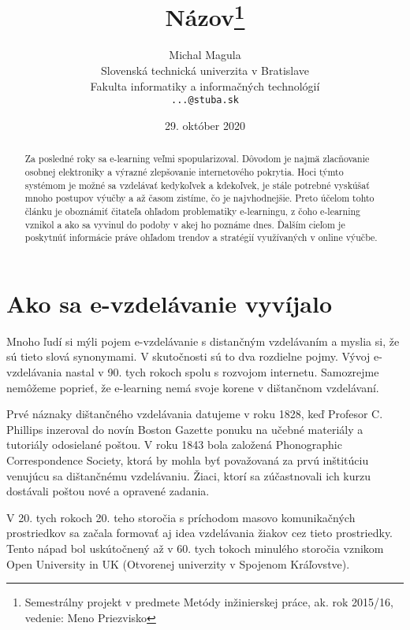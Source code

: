 \documentclass[10pt,twoside,slovak,a4paper]{article}
\title{Názov\thanks{Semestrálny projekt v predmete Metódy inžinierskej práce, ak. rok 2015/16, vedenie: Meno Priezvisko}} %
\author{Michal Magula\\[2pt]
	{\small Slovenská technická univerzita v Bratislave}\\
	{\small Fakulta informatiky a informačných technológií}\\
	{\small \texttt{...@stuba.sk}}
	}
\date{\small 29. október 2020}
\begin{document}
    \begin{abstract}
        Za posledné roky sa e-learning veľmi spopularizoval. Dôvodom je najmä zlacňovanie osobnej elektroniky
        a výrazné zlepšovanie internetového pokrytia. Hoci týmto systémom je možné sa vzdelávať kedykoľvek
        a kdekoľvek, je stále potrebné vyskúšať mnoho postupov výučby a až časom zistíme, čo je najvhodnejšie.
        Preto účelom tohto článku je oboznámiť čitateľa ohľadom problematiky e-learningu, z čoho e-learning
        vznikol a ako sa vyvinul do podoby v akej ho poznáme dnes. Ďalším cieľom je poskytnúť informácie práve
        ohľadom trendov a stratégií využívaných v online výučbe.
    \end{abstract}

    \section{Ako sa e-vzdelávanie vyvíjalo}
        Mnoho ľudí si mýli pojem e-vzdelávanie s distančným vzdelávaním a myslia si, že sú tieto slová synonymami.
        V skutočnosti sú to dva rozdielne pojmy. Vývoj e-vzdelávania nastal v 90. tych rokoch spolu s rozvojom internetu.
        Samozrejme nemôžeme poprieť, že e-learning nemá svoje korene v dištančnom vzdelávaní.

        Prvé náznaky dištančného vzdelávania datujeme v roku 1828, keď Profesor C. Phillips inzeroval do novín
        Boston Gazette ponuku na učebné materiály a tutoriály odosielané poštou. V roku 1843 bola 
        založená Phonographic Correspondence Society, ktorá by mohla byť považovaná za prvú inštitúciu 
        venujúcu sa dištančnému vzdelávaniu. Žiaci, ktorí sa zúčastnovali ich kurzu dostávali poštou
        nové a opravené zadania.

        V 20. tych rokoch 20. teho storočia s príchodom masovo komunikačných prostriedkov sa začala formovať aj idea
        vzdelávania žiakov cez tieto prostriedky. Tento nápad bol uskútočnený až v 60. tych tokoch minulého storočia 
        vznikom Open University in UK (Otvorenej univerzity v Spojenom Kráľovstve).
\end{document}
